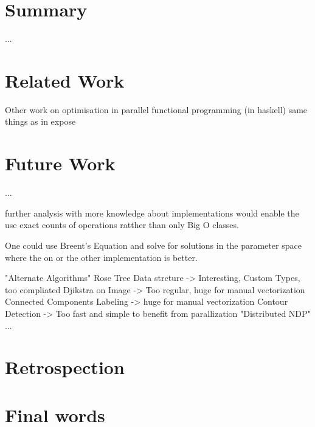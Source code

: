 

\section{Summary}
  ...

\section{Related Work}
  Other work on optimisation in parallel functional programming (in haskell)
  same things as in expose
  
\section{Future Work}
  ...
  
  further analysis with more knowledge about implementations
  would enable the use exact counts of operations ratther than only Big O classes.
  
  One could use Breent's Equation and solve for
  solutions in the parameter space where the on or the other
  implementation is better.
  
  "Alternate Algorithms"
    Rose Tree Data strcture -> Interesting, Custom Types, too compliated
    Djikstra on Image -> Too regular, huge for manual vectorization
      Connected Components Labeling -> huge for manual vectorization
      Contour Detection -> Too fast and simple to benefit from parallization
  "Distributed NDP"
    ...

\section{Retrospection}

\section{Final words}


